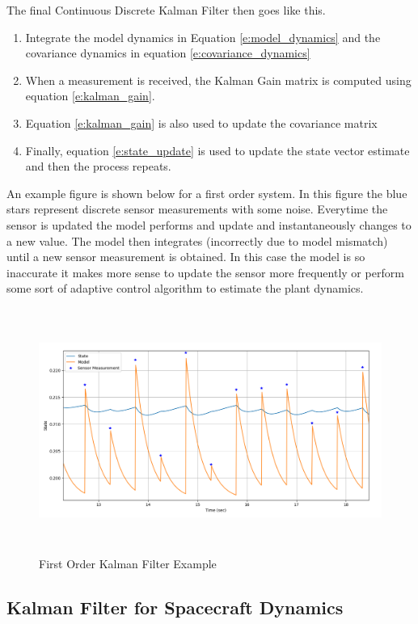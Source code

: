 \documentclass{article}
\begin{document}
The final Continuous Discrete Kalman Filter then goes like this.
\begin{enumerate}
  \item Integrate the model dynamics in Equation
    \ref{e:model_dynamics} and the covariance dynamics in equation
    \ref{e:covariance_dynamics}
  \item When a measurement is received, the Kalman Gain matrix is
    computed using equation \ref{e:kalman_gain}. 
  \item Equation \ref{e:kalman_gain} is also used to update the
    covariance matrix
  \item Finally, equation \ref{e:state_update} is used to update the
    state vector estimate and then the process repeats.
\end{enumerate}
An example figure is shown below for a first order system. In this
figure the blue stars represent discrete sensor measurements with some
noise. Everytime the sensor is updated the model performs and update
and instantaneously changes to a new value. The model then integrates
(incorrectly due to model mismatch) until a new sensor measurement is
obtained. In this case the model is so inaccurate it makes more sense
to update the sensor more frequently or perform some sort of adaptive
control algorithm to estimate the plant dynamics.
\begin{figure}[H]
  \begin{center}
    \includegraphics[height=80mm, width=140mm]{Figures/Kalman_Filter_Example.png}
  \end{center}
  \caption{First Order Kalman Filter Example}\label{f:kalman}
\end{figure}
    
\subsection{Kalman Filter for Spacecraft Dynamics}
\end{document}
